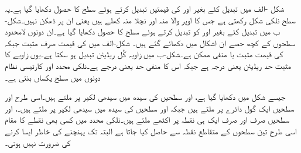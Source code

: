 شکل -الف میں  تبدیل کئے بغیر  اور  کی قیمتیں تبدیل کرتے ہوئے  سطح کا حصول دکھایا گیا ہے۔یہ سطح نلکی شکل رکھتی ہے  جس کا اوپر والا منہ اور نچلا منہ کھلے ہیں یعنی ان پر ڈھکن نہیں۔شکل-ب میں  تبدیل کئے بغیر  اور  کو تبدیل کرتے ہوئے  سطح کا حصول دکھایا گیا ہے۔ان دونوں لامحدود سطحوں کے کچھ حصے ان  اشکال میں  دکھائے گئے ہیں۔ شکل-الف میں  کی قیمت صرف مثبت جبکہ  کی قیمت مثبت یا منفی ممکن ہے۔شکل-ب میں زاویہ کُل  ریڈیئن تبدیل ہو سکتا ہے۔یوں زاویے کا مثبت حد  ریڈیئن یعنی  درجہ ہے جبکہ اس کا منفی حد  یعنی  درجے ہے۔نلکی محدد اور کارتیسی نظام دونوں میں   سطح یکساں بنتی ہے۔

جیسے شکل  میں دکھایا گیا ہے،  اور   سطحیں  کی سیدھ میں سیدھی لکیر پر ملتے ہیں۔اسی طرح  اور  سطحیں ایک گول دائرے پر ملتے ہیں جبکہ  اور  سطحیں  کی سیدھ میں سیدھی لکیر پر ملتے ہیں۔،  اور  سطحیں صرف اور صرف ایک ہی نقطہ  پر اکٹھے ملتے ہیں۔نلکی محدد میں کسی بھی نقطے  کا مقام اسی طرح تین سطحوں کے  متقاطع نقطہ سے حاصل کیا جاتا ہے البتہ  تک پہنچنے کی خاطر ایسا کرنے کی ضرورت نہیں ہوتی۔

